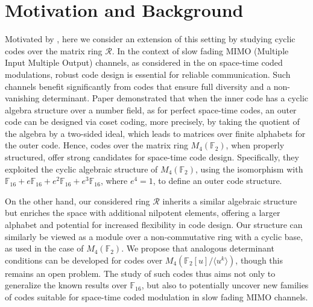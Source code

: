 \documentclass{amsart}
\theoremstyle{definition}
\theoremstyle{remark}
\numberwithin{equation}{section}
\begin{document}
    \section{ Motivation and  Background  }

    Motivated by \cite{F}, here we consider an extension of this setting by studying cyclic codes over the matrix ring $\mathcal{R}$.  In the context of slow fading MIMO (Multiple Input Multiple Output) channels, as considered in the \cite{F} on space-time coded modulations, robust code design is essential for reliable communication. Such channels benefit significantly from codes that ensure full diversity and a non-vanishing determinant. Paper demonstrated that when the inner code has a cyclic algebra structure over a number field, as for perfect space-time codes, an outer code can be designed via coset coding, more precisely, by taking the quotient of the algebra by a two-sided ideal, which leads to matrices over finite alphabets for the outer code. Hence, codes over the matrix ring \( M_4(\mathbb{F}_2) \), when properly structured, offer strong candidates for space-time code design. Specifically, they exploited the cyclic algebraic structure of \( M_4(\mathbb{F}_2) \), using the isomorphism with \( \mathbb{F}_{16} + e\mathbb{F}_{16} + e^2\mathbb{F}_{16} + e^3\mathbb{F}_{16} \), where \( e^4 = 1 \), to define an outer code structure. 
   
   On the other hand, our considered ring $\mathcal{R}$ inherits a similar algebraic structure but enriches the space with additional nilpotent elements, offering a larger alphabet and potential for increased flexibility in code design.  Our structure can similarly be viewed as a module over a non-commutative ring with a cyclic base, as used in the case of $M_4(\mathbb{F}_2)$. We propose that analogous determinant conditions can be developed for codes over $M_4 (\mathbb F_2 [u]/ \langle u^k \rangle)$, though this remains an open problem. The study of such codes thus aims not only to generalize the known results over $\mathbb{F}_{16}$, but also to potentially uncover new families of codes suitable for space-time coded modulation in slow fading MIMO channels.
    
\end{document}
